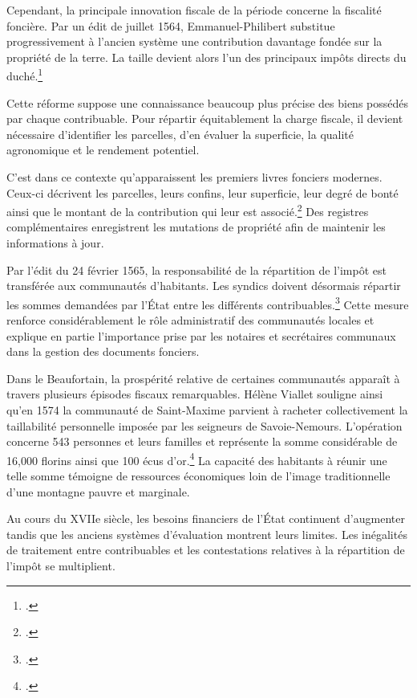 \documentclass[12pt,a4paper]{report}
\begin{document}
Cependant, la principale innovation fiscale de la période concerne la fiscalité foncière. Par un édit de juillet 1564, Emmanuel-Philibert substitue progressivement à l'ancien système une contribution davantage fondée sur la propriété de la terre. La taille devient alors l'un des principaux impôts directs du duché.\footcite[272]{HVialletSel}

Cette réforme suppose une connaissance beaucoup plus précise des biens possédés par chaque contribuable. Pour répartir équitablement la charge fiscale, il devient nécessaire d'identifier les parcelles, d'en évaluer la superficie, la qualité agronomique et le rendement potentiel.

C'est dans ce contexte qu'apparaissent les premiers livres fonciers modernes. Ceux-ci décrivent les parcelles, leurs confins, leur superficie, leur degré de bonté ainsi que le montant de la contribution qui leur est associé.\footcite[272]{HVialletSel} Des registres complémentaires enregistrent les mutations de propriété afin de maintenir les informations à jour.

Par l'édit du 24 février 1565, la responsabilité de la répartition de l'impôt est transférée aux communautés d'habitants. Les syndics doivent désormais répartir les sommes demandées par l'État entre les différents contribuables.\footcite[272]{HVialletSel} Cette mesure renforce considérablement le rôle administratif des communautés locales et explique en partie l'importance prise par les notaires et secrétaires communaux dans la gestion des documents fonciers.

Dans le Beaufortain, la prospérité relative de certaines communautés apparaît à travers plusieurs épisodes fiscaux remarquables. Hélène Viallet souligne ainsi qu'en 1574 la communauté de Saint-Maxime parvient à racheter collectivement la taillabilité personnelle imposée par les seigneurs de Savoie-Nemours. L'opération concerne 543 personnes et leurs familles et représente la somme considérable de 16,000 florins ainsi que 100 écus d'or.\footcite[32]{HViallet1993} La capacité des habitants à réunir une telle somme témoigne de ressources économiques loin de l'image traditionnelle d'une montagne pauvre et marginale.

Au cours du XVIIe siècle, les besoins financiers de l'État continuent d'augmenter tandis que les anciens systèmes d'évaluation montrent leurs limites. Les inégalités de traitement entre contribuables et les contestations relatives à la répartition de l'impôt se multiplient.

\vspace{1em}
\end{document}
